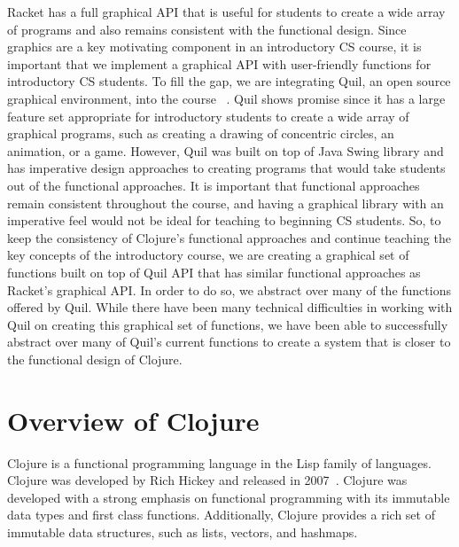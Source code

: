 \documentclass[12pt]{article}
\newcommand{\comment}[1]{{\bf \tt  {#1}}}
\newcommand{\emcomment}[1]{\textcolor{ForestGreen}{\comment{Elena: {#1}}}}
\newcommand{\todo}[1]{\textcolor{blue}{\comment{To Do: {#1}}}}
\newcommand{\mmcomment}[1]{\textcolor{magenta}{\comment{Max: {#1}}}}
\begin{document}
Racket has a full graphical API that is useful for students to create a wide array of programs and also remains consistent with the functional design.
Since graphics are a key motivating component in an introductory CS course, it is important that we implement a graphical API with user-friendly functions for introductory CS students. To fill the gap, we are integrating Quil, an open source graphical environment, into the course ~\cite{Quil}. Quil shows promise since it has a large feature set appropriate for introductory students to create a wide array of graphical programs, such as creating a drawing of concentric circles, an animation, or a game. However, Quil was built on top of Java Swing library and has imperative design approaches to creating programs that would take students out of the functional approaches. It is important that functional approaches remain consistent throughout the course, and having a graphical library with an imperative feel would not be ideal for teaching to beginning CS students. So, to keep the consistency of Clojure's functional approaches and continue teaching the key concepts of the introductory course, we are creating a graphical set of functions built on top of Quil API that has similar functional approaches as Racket's graphical API. In order to do so, we abstract over many of the functions offered by Quil. While there have been many technical difficulties in working with Quil on creating this graphical set of functions, we have been able to successfully abstract over many of Quil's current functions to create a system that is closer to the functional design of Clojure.


\section{Overview of Clojure}\label{sec:clojure}
Clojure is a functional programming language in the Lisp family of languages. Clojure was developed by Rich Hickey and released in 2007~\cite{Hickey:2008}. Clojure was developed with a strong emphasis on functional programming with its immutable data types and first class functions. Additionally, Clojure provides a rich set of  immutable data structures, such as lists, vectors, and hashmaps.
\end{document}
